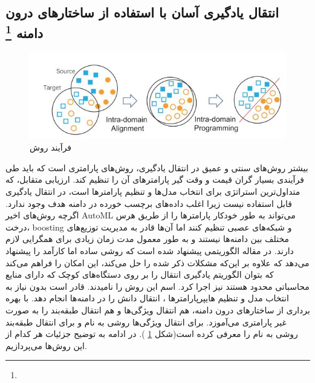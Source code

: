 {	\subsection{انتقال یادگیری آسان با استفاده از ساختارهای درون دامنه
		\protect \footnote{}}
	{
		\begin{figure}
			\centering
			\includegraphics[scale=0.6]{images/easyTL.JPG}
			\caption{ فرآیند روش 
				  }
			\label{fig:6}
		\end{figure}
		بیشتر روش‌های سنتی و عمیق در انتقال یادگیری، روش‌های پارامتری است که باید طی فرآیندی بسیار گران قیمت و وقت گیر پارامترهای آن را تنظیم کند. ارزیابی متقابل، که متداول‌ترین استراتژی برای انتخاب مدل‌ها و تنظیم پارامترها است، در انتقال یادگیری قابل استفاده نیست زیرا اغلب داده‌های برچسب خورده در دامنه هدف وجود ندارد. اگرچه روش‌های اخیر AutoML می‌تواند به طور خودکار پارامترها را از طریق هرس درخت، boosting و شبکه‌های عصبی تنظیم کنند اما آن‌ها قادر به مدیریت توزیع‌های مختلف بین دامنه‌ها نیستند و به طور معمول مدت زمان زیادی برای همگرایی لازم دارند. در مقاله
		\cite{wang2019easy}
		الگوریتمی پیشنهاد شده است که روشی ساده اما کارآمد را پیشنهاد می‌دهد که علاوه بر این‌که مشکلات ذکر شده را حل می‌کند، این امکان را فراهم می‌کند که بتوان الگوریتم یادگیری انتقال را بر روی دستگاه‌های کوچک که دارای منایع محاسباتی محدود هستند نیز اجرا کرد. اسم این روش را
		نامیدند.
		قادر است بدون نیاز به انتخاب مدل و تنظیم هایپرپارامترها ، انتقال دانش را در دامنه‌ها انجام دهد.
		با بهره برداری از ساختارهای درون دامنه، هم انتقال ویژگی‌ها و هم انتقال طبقه‌بند را به صورت غیر پارامتری می‌آموزد. برای انتقال ویژگی‌ها روشی به نام
		و برای انتقال طبقه‌بند روشی به نام
		را معرفی کرده است(شکل 
		\ref{fig:6}
		). در ادامه به توضیح جزئیات هر کدام از این روش‌ها می‌پردازیم.
		
}}
